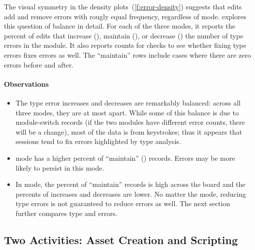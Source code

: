 \documentclass[english,submission,cleveref]{programming}
\begin{document}
The visual symmetry in the density plots~(\cref{f:error-density})
suggests that edits add and remove errors with rougly equal frequency,
regardless of mode.
 explores this question of balance in detail.
For each of the three modes, it reports the percent of edits that increase (\addsym{}),
maintain (\keepsym{}), or decrease (\dropsym{}) the number of type
errors in the module.
It also reports counts for \FS{} checks to see whether fixing type errors fixes
\FS{} errors as well.
The ``maintain'' rows include cases where there are zero errors before and after.


\paragraph{Observations}

\begin{itemize}
  \item
    The type error increases and decreases are remarkably balanced: across all
    three modes, they are at most  apart.
    While some of this balance is due to module-switch records
    (if the two modules have different error counts, there will be a change),
    most of the data is from keystrokes; thus it appears that sessions tend to
    fix errors highlighted by type analysis.

  \item
    \mstrict{} mode has a higher percent of ``maintain'' (\keepsym{}) records.
    Errors may be more likely to persist in this mode.

  \item
    In \FS{} mode, the percent of ``maintain'' records is high across
    the board and the percents of increases and decreases are lower.
    No matter the mode, reducing type errors is not guaranteed to reduce
    \FS{} errors as well.
    The next section further compares type and \FS{} errors.

\end{itemize}


\subsection{Two Activities: Asset Creation and Scripting}
\label{s:strict-vs-forcedstrict}
\end{document}
